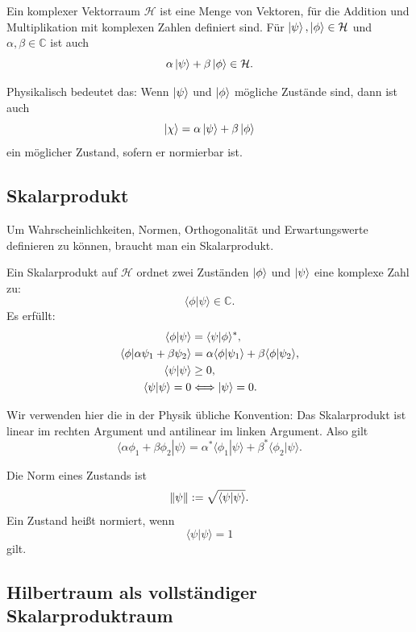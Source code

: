 \begin{definitionbox}
Ein komplexer Vektorraum $\mathcal H$ ist eine Menge von Vektoren, für die Addition und Multiplikation mit komplexen Zahlen definiert sind. Für $\left|\psi\right\rangle,\left|\phi\right\rangle\in\mathcal H$ und $\alpha,\beta\in\mathbb C$ ist auch
\[
    \alpha\left|\psi\right\rangle+\beta\left|\phi\right\rangle\in\mathcal H.
\]
\end{definitionbox}

Physikalisch bedeutet das: Wenn $\left|\psi\right\rangle$ und $\left|\phi\right\rangle$ mögliche Zustände sind, dann ist auch
\[
    \left|\chi\right\rangle=\alpha\left|\psi\right\rangle+\beta\left|\phi\right\rangle
\]
ein möglicher Zustand, sofern er normierbar ist.

\subsection{Skalarprodukt}

Um Wahrscheinlichkeiten, Normen, Orthogonalität und Erwartungswerte definieren zu können, braucht man ein Skalarprodukt.

\begin{definitionbox}
Ein Skalarprodukt auf $\mathcal H$ ordnet zwei Zuständen $\left|\phi\right\rangle$ und $\left|\psi\right\rangle$ eine komplexe Zahl zu:
\[
    \langle \phi|\psi\rangle\in\mathbb C.
\]
Es erfüllt:
\begin{align*}
    \langle \phi|\psi\rangle &= \langle \psi|\phi\rangle^*, \\
    \langle \phi|\alpha\psi_1+\beta\psi_2\rangle
    &=\alpha\langle\phi|\psi_1\rangle+\beta\langle\phi|\psi_2\rangle, \\
    \langle \psi|\psi\rangle &\ge 0, \\
    \langle \psi|\psi\rangle=0 &\Longleftrightarrow \left|\psi\right\rangle=0.
\end{align*}
\end{definitionbox}

Wir verwenden hier die in der Physik übliche Konvention: Das Skalarprodukt ist linear im rechten Argument und antilinear im linken Argument. Also gilt
\[
    \langle \alpha\phi_1+\beta\phi_2|\psi\rangle
    =\alpha^*\langle\phi_1|\psi\rangle+\beta^*\langle\phi_2|\psi\rangle.
\]

\begin{definitionbox}
Die Norm eines Zustands ist
\[
    \left\lVert \psi \right\rVert:=\sqrt{\langle\psi|\psi\rangle}.
\]
Ein Zustand heißt normiert, wenn
\[
    \langle\psi|\psi\rangle=1
\]
gilt.
\end{definitionbox}

\subsection{Hilbertraum als vollständiger Skalarproduktraum}


